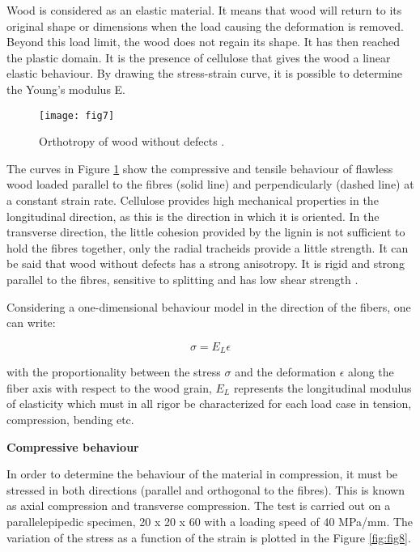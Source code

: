 Wood is considered as an elastic material. It means that wood will return to its original shape or dimensions when the load causing the deformation is removed. Beyond this load limit, the wood does not regain its shape. It has then reached the plastic domain. It is the presence of cellulose that gives the wood a linear elastic behaviour. By drawing the stress-strain curve, it is possible to determine the Young's modulus E.


\begin{figure}[htp]
	\centering
	\texttt{[image: fig7]}
	\caption{Orthotropy of wood without defects \citep{Taazount2021}.}
	\label{fig:fig7}
\end{figure}

The curves in Figure \ref{fig:fig7} show the compressive and tensile behaviour of flawless wood loaded parallel to the fibres (solid line) and perpendicularly (dashed line) at a constant strain rate. Cellulose provides high mechanical properties in the longitudinal direction, as this is the direction in which it is oriented. In the transverse direction, the little cohesion provided by the lignin is not sufficient to hold the fibres together, only the radial tracheids provide a little strength. It can be said that wood without defects has a strong anisotropy. It is rigid and strong parallel to the fibres, sensitive to splitting and has low shear strength \citep{Taazount2021}.

Considering a one-dimensional behaviour model in the direction of the fibers, one can write:

\begin{equation}
	\sigma = E_{L} \epsilon
	\label{eq:eq14}
\end{equation}

\noindent with the proportionality between the stress $\sigma$ and the deformation $\epsilon$ along the fiber axis with respect to the wood grain, $ E_L $ represents the longitudinal modulus of elasticity which must in all rigor be characterized for each load case in tension, compression, bending etc.


\textbf{Compressive behaviour}

In order to determine the behaviour of the material in compression, it must be stressed in both directions (parallel and orthogonal to the fibres). This is known as axial compression and transverse compression. The test is carried out on a parallelepipedic specimen, 20 x 20 x 60  with a loading speed of 40 MPa/mm. The variation of the stress as a function of the strain is plotted in the Figure \ref{fig:fig8}.


